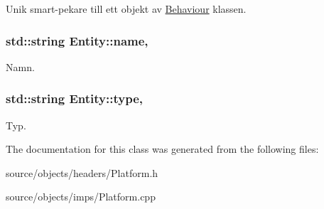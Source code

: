 Unik smart-\/pekare till ett objekt av \hyperlink{classBehaviour}{Behaviour} klassen. 

\hypertarget{classEntity_a931b21fbdebb1a5963b4bcab5df128f5}{
\subsubsection[{name}]{\setlength{\rightskip}{0pt plus 5cm}std\+::string Entity\+::name\hspace{0.3cm}{\ttfamily [protected]}, {\ttfamily [inherited]}}}\label{classEntity_a931b21fbdebb1a5963b4bcab5df128f5}


Namn. 

\hypertarget{classEntity_a298a9ebf2474bb00874b5ff6a0d637ef}{
\subsubsection[{type}]{\setlength{\rightskip}{0pt plus 5cm}std\+::string Entity\+::type\hspace{0.3cm}{\ttfamily [protected]}, {\ttfamily [inherited]}}}\label{classEntity_a298a9ebf2474bb00874b5ff6a0d637ef}


Typ. 



The documentation for this class was generated from the following files\+:\begin{DoxyCompactItemize}
\item 
source/objects/headers/Platform.\+h\item 
source/objects/imps/Platform.\+cpp\end{DoxyCompactItemize}

